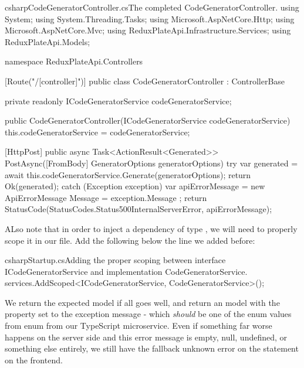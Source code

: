 \documentclass[a4paper,headinclude=on,footinclude=on,12pt,oneside]{scrbook}
\begin{document}
\begin{codeInput}{csharp}{CodeGeneratorController.cs}{The completed CodeGeneratorController.}
using System;
using System.Threading.Tasks;
using Microsoft.AspNetCore.Http;
using Microsoft.AspNetCore.Mvc;
using ReduxPlateApi.Infrastructure.Services;
using ReduxPlateApi.Models;

namespace ReduxPlateApi.Controllers
{
    [Route("/[controller]")]
    public class CodeGeneratorController : ControllerBase
    {
        private readonly ICodeGeneratorService codeGeneratorService;

        public CodeGeneratorController(ICodeGeneratorService codeGeneratorService)
        {
            this.codeGeneratorService = codeGeneratorService;
        }

        [HttpPost]
        public async Task<ActionResult<Generated>> PostAsync([FromBody] GeneratorOptions generatorOptions)
        {
            try
            {
                var generated = await this.codeGeneratorService.Generate(generatorOptions);
                return Ok(generated);
            } catch (Exception exception)
            {
                var apiErrorMessage = new ApiErrorMessage
                {
                    Message = exception.Message
                };
                return StatusCode(StatusCodes.Status500InternalServerError, apiErrorMessage);
            }
        }
    }
}  
\end{codeInput}

ALso note that in order to inject a dependency of type , we will need to properly scope it in our  file. Add the following below the  line we added before:

\begin{codeInput}{csharp}{Startup.cs}{Adding the proper scoping between interface ICodeGeneratorService and implementation CodeGeneratorService.}
services.AddScoped<ICodeGeneratorService, CodeGeneratorService>();
\end{codeInput}

We return the expected  model if all goes well, and return an  model with the  property set to the exception message - which \textit{should} be one of the enum values from  enum from our TypeScript microservice. Even if something far worse happens on the server side and this error message is empty, null, undefined, or something else entirely, we still have the fallback unknown error on the  statement on the frontend.
\end{document}
